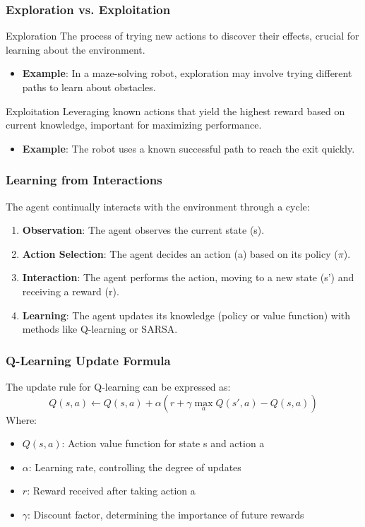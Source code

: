 \documentclass[aspectratio=169]{beamer}
\begin{document}
\begin{frame}[fragile]
    \frametitle{Exploration vs. Exploitation}
    \begin{block}{Exploration}
        The process of trying new actions to discover their effects, crucial for learning about the environment.
        \begin{itemize}
            \item \textbf{Example}: In a maze-solving robot, exploration may involve trying different paths to learn about obstacles.
        \end{itemize}
    \end{block}
    
    \begin{block}{Exploitation}
        Leveraging known actions that yield the highest reward based on current knowledge, important for maximizing performance.
        \begin{itemize}
            \item \textbf{Example}: The robot uses a known successful path to reach the exit quickly.
        \end{itemize}
    \end{block}
\end{frame}

\begin{frame}[fragile]
    \frametitle{Learning from Interactions}
    The agent continually interacts with the environment through a cycle:
    \begin{enumerate}
        \item \textbf{Observation}: The agent observes the current state (s).
        \item \textbf{Action Selection}: The agent decides an action (a) based on its policy (\(\pi\)).
        \item \textbf{Interaction}: The agent performs the action, moving to a new state (s') and receiving a reward (r).
        \item \textbf{Learning}: The agent updates its knowledge (policy or value function) with methods like Q-learning or SARSA.
    \end{enumerate}
\end{frame}

\begin{frame}[fragile]
    \frametitle{Q-Learning Update Formula}
    The update rule for Q-learning can be expressed as:
    \begin{equation}
        Q(s,a) \leftarrow Q(s,a) + \alpha \left( r + \gamma \max_{a}Q(s', a) - Q(s,a) \right)
    \end{equation}
    Where:
    \begin{itemize}
        \item \( Q(s,a) \): Action value function for state s and action a
        \item \( \alpha \): Learning rate, controlling the degree of updates
        \item \( r \): Reward received after taking action a
        \item \( \gamma \): Discount factor, determining the importance of future rewards
    \end{itemize}
\end{frame}
\end{document}
